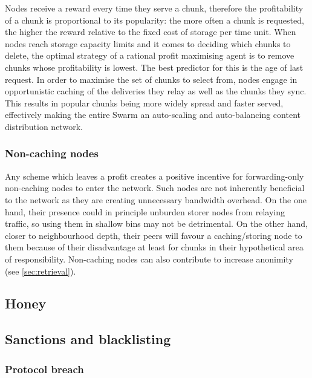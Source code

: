 Nodes receive a reward every time they serve a chunk, therefore the profitability of a chunk is proportional to its popularity: the more often a chunk is requested, the higher the reward relative to the fixed cost of storage per time unit. When nodes reach storage capacity limits and it comes to deciding which chunks to delete, the optimal strategy of a rational profit maximising agent is to remove chunks whose profitability is lowest. The best predictor for this is the age of last request. In order to maximise the set of chunks to select from, nodes engage in opportunistic caching of the deliveries they relay as well as the chunks they sync. This results in popular chunks being more widely spread and faster served, effectively making the entire Swarm an auto-scaling and auto-balancing content distribution network.


\subsubsection{Non-caching nodes}

Any scheme which leaves  a profit creates a positive incentive for forwarding-only non-caching nodes to enter the network. Such nodes are not inherently beneficial to the network as they are creating unnecessary bandwidth overhead. On the one hand, their presence could in principle unburden storer nodes from relaying traffic, so using them in shallow bins may not be detrimental. On the other hand, closer to neighbourhood depth, their peers will favour a caching/storing node to them because of their disadvantage at least for chunks in their hypothetical area of responsibility. Non-caching nodes can also contribute to increase anonimity (see \ref{sec:retrieval}).


\subsection{Honey}\label{sec:honey}


\subsection{Sanctions and blacklisting}\label{sec:sanctions}

\subsubsection{Protocol breach}

